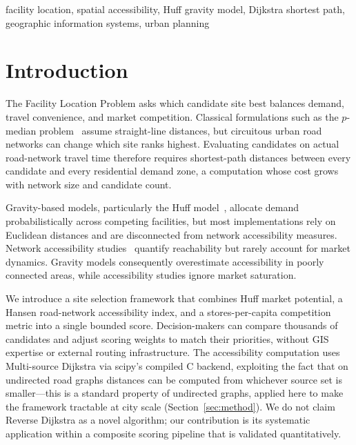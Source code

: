 \documentclass[conference]{IEEEtran}
\begin{document}
\begin{IEEEkeywords}
facility location, spatial accessibility, Huff gravity model,
Dijkstra shortest path, geographic information systems, urban planning
\end{IEEEkeywords}

\section{Introduction}

The Facility Location Problem asks which candidate site best balances
demand, travel convenience, and market competition.  Classical
formulations such as the $p$-median problem~\cite{ReVelle2005} assume
straight-line distances, but circuitous urban road networks can change
which site ranks highest.  Evaluating candidates on actual road-network
travel time therefore requires shortest-path distances between every
candidate and every residential demand zone, a computation whose cost
grows with network size and candidate count.

Gravity-based models, particularly the Huff model~\cite{Huff1964},
allocate demand probabilistically across competing facilities, but most
implementations rely on Euclidean distances and are disconnected from
network accessibility measures.  Network accessibility
studies~\cite{Hansen1959, Xu2020} quantify reachability but rarely
account for market dynamics.  Gravity models consequently overestimate
accessibility in poorly connected areas, while accessibility studies
ignore market saturation.

We introduce a site selection framework that combines Huff market
potential, a Hansen road-network accessibility index, and a
stores-per-capita competition metric into a single bounded score.
Decision-makers can compare thousands of candidates and adjust scoring
weights to match their priorities, without GIS expertise or external
routing infrastructure.  The accessibility computation uses
Multi-source Dijkstra via scipy's compiled C backend, exploiting the
fact that on undirected road graphs distances can be computed from
whichever source set is smaller---this is a standard property of
undirected graphs, applied here to make the framework tractable at city
scale (Section~\ref{sec:method}).  We do not claim Reverse Dijkstra as
a novel algorithm; our contribution is its systematic application within
a composite scoring pipeline that is validated quantitatively.
\end{document}
